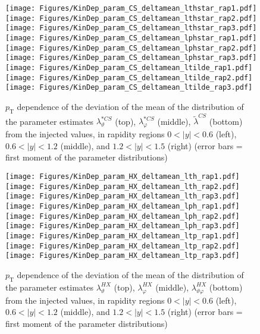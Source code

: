 \documentclass[12pt]{article}
\newcommand{\pT}{p_\mathrm{T}}
\newcommand{\absy}{\left |  y \right |}
\newcommand{\lamtildeCS}{\tilde{\lambda}^{\scriptscriptstyle CS}}
\newcommand{\lamthstarCS}{\lambda^{* \scriptscriptstyle CS}_\vartheta}
\newcommand{\lamphstarCS}{\lambda^{* \scriptscriptstyle CS}_\varphi}
\newcommand{\lamthHX}{\lambda^{\scriptscriptstyle HX}_\vartheta}
\newcommand{\lamphHX}{\lambda^{\scriptscriptstyle HX}_\varphi}
\newcommand{\lamthphHX}{\lambda^{\scriptscriptstyle HX}_{\vartheta \varphi}}
\begin{document}
\begin{figure}[htbp]
\centering
\texttt{[image: Figures/KinDep\_param\_CS\_deltamean\_lthstar\_rap1.pdf]}
\texttt{[image: Figures/KinDep\_param\_CS\_deltamean\_lthstar\_rap2.pdf]}
\texttt{[image: Figures/KinDep\_param\_CS\_deltamean\_lthstar\_rap3.pdf]}
\texttt{[image: Figures/KinDep\_param\_CS\_deltamean\_lphstar\_rap1.pdf]}
\texttt{[image: Figures/KinDep\_param\_CS\_deltamean\_lphstar\_rap2.pdf]}
\texttt{[image: Figures/KinDep\_param\_CS\_deltamean\_lphstar\_rap3.pdf]}
\texttt{[image: Figures/KinDep\_param\_CS\_deltamean\_ltilde\_rap1.pdf]}
\texttt{[image: Figures/KinDep\_param\_CS\_deltamean\_ltilde\_rap2.pdf]}
\texttt{[image: Figures/KinDep\_param\_CS\_deltamean\_ltilde\_rap3.pdf]}
\caption{$\pT$ dependence of the deviation of the mean of the distribution of
the parameter estimates $\lamthstarCS$ (top), $\lamphstarCS$ (middle),
$\lamtildeCS$ (bottom) from the injected values, in rapidity regions
$0<\absy<0.6$ (left), $0.6<\absy<1.2$ (middle), and $1.2<\absy<1.5$ (right) (error bars = first moment of
the parameter distributions)}
\end{figure}
\clearpage









\begin{figure}[htbp]
\centering
\texttt{[image: Figures/KinDep\_param\_HX\_deltamean\_lth\_rap1.pdf]}
\texttt{[image: Figures/KinDep\_param\_HX\_deltamean\_lth\_rap2.pdf]}
\texttt{[image: Figures/KinDep\_param\_HX\_deltamean\_lth\_rap3.pdf]}
\texttt{[image: Figures/KinDep\_param\_HX\_deltamean\_lph\_rap1.pdf]}
\texttt{[image: Figures/KinDep\_param\_HX\_deltamean\_lph\_rap2.pdf]}
\texttt{[image: Figures/KinDep\_param\_HX\_deltamean\_lph\_rap3.pdf]}
\texttt{[image: Figures/KinDep\_param\_HX\_deltamean\_ltp\_rap1.pdf]}
\texttt{[image: Figures/KinDep\_param\_HX\_deltamean\_ltp\_rap2.pdf]}
\texttt{[image: Figures/KinDep\_param\_HX\_deltamean\_ltp\_rap3.pdf]}
\caption{$\pT$ dependence of the deviation of the mean of the distribution of
the parameter estimates $\lamthHX$ (top), $\lamphHX$ (middle), $\lamthphHX$
(bottom) from the injected values, in rapidity regions $0<\absy<0.6$ (left), 
$0.6<\absy<1.2$ (middle), and $1.2<\absy<1.5$ (right) (error bars = first moment of the parameter
distributions)}
\end{figure}
\clearpage
\end{document}
